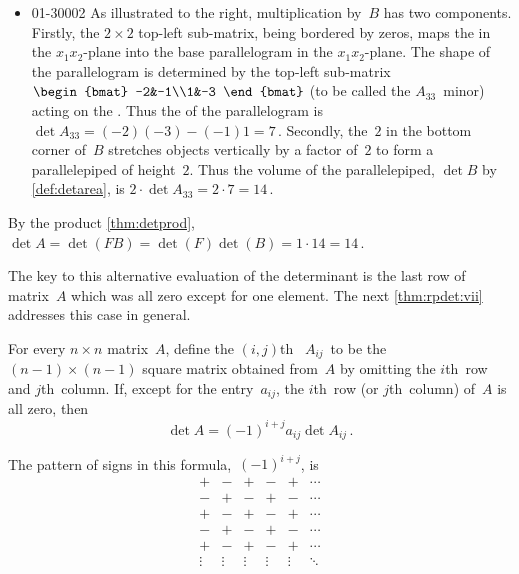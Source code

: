 \begin{example}
\begin{solution}
\begin{itemize}
\begin{itemize}
\item 
\begin{figbox}{01{-3}000{2}}%
As illustrated  to the right, multiplication by~\(B\) has two components.
Firstly,  the \(2\times2\) top-left sub-matrix, being bordered by zeros, maps the  in the \(x_1x_2\)-plane into the base parallelogram in the \(x_1x_2\)-plane.
The shape of the parallelogram is determined by the top-left sub-matrix \(\begin{bmat} -2&-1\\1&-3 \end{bmat}\) (to be called the \(A_{33}\)~minor) acting on the .
Thus the  of the parallelogram is \(\det A_{33}=(-2)(-3)-(-1)1=7\)\,.
Secondly, the~\(2\) in the bottom corner of~\(B\) stretches objects vertically by a factor of~\(2\) to form a parallelepiped of height~\(2\).
Thus the volume of the parallelepiped, \(\det B\) by \cref{def:detarea}, is \(2\cdot\det A_{33}=2\cdot 7=14\)\,.
\end{figbox}

\end{itemize}
By the product \cref{thm:detprod},
\(\det A=\det(FB)=\det(F)\det(B)=1\cdot14=14\)\,.

\end{itemize}
The key to this alternative evaluation of the determinant is the last row of matrix~\(A\) which was all zero except for one element.
The next \cref{thm:rpdet:vii} addresses this case in general.
\end{solution}
\end{example}











\begin{theorem} \label{thm:rpdet:vii} 
%
For every \(n\times n\) matrix~\(A\),
define the \((i,j)\)th~ \(A_{ij}\)~to be the \((n-1)\times(n-1)\) square matrix obtained from~\(A\) by omitting the \(i\)th~row and \(j\)th~column.  
If, except for the entry~\(a_{ij}\), the \(i\)th~row (or \(j\)th~column) of~\(A\) is all zero, then 
\begin{equation}
\det A=(-1)^{i+j}a_{ij}\det A_{ij}\,.
\label{eq:rpdet:vii}
\end{equation}
\end{theorem}
The pattern of signs in this formula,~\((-1)^{i+j}\), is 
\begin{equation*}
\begin{matrix} +&-&+&-&+&\cdots
\\-&+&-&+&-&\cdots
\\+&-&+&-&+&\cdots
\\-&+&-&+&-&\cdots
\\+&-&+&-&+&\cdots
\\\vdots&\vdots&\vdots&\vdots&\vdots&\ddots \end{matrix}
\end{equation*}

